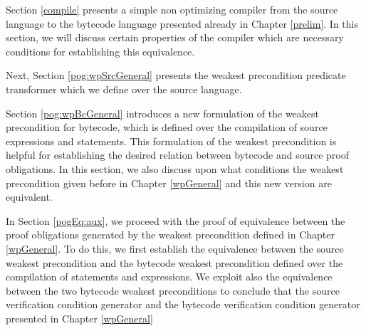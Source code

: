 Section \ref{compile} presents a simple non optimizing compiler from the source language to the bytecode
 language presented already in Chapter \ref{prelim}. In this section, we will discuss certain properties of the 
compiler which are necessary conditions for establishing this equivalence.

Next, Section \ref{pog:wpSrcGeneral} presents the weakest precondition predicate 
transformer which we define over the source language.

Section  \ref{pog:wpBcGeneral} introduces a new formulation of the weakest precondition for bytecode, which 
is defined over the  compilation of source expressions and statements. This formulation of the weakest precondition
 is helpful for establishing the desired 
relation between bytecode and source proof obligations.
 In this section, we also discuss upon what conditions
the weakest precondition given before in Chapter \ref{wpGeneral} and 
this new version are equivalent.

In Section \ref{pogEq:aux}, we proceed with the proof of equivalence between the proof obligations generated 
by the weakest precondition defined in  Chapter \ref{wpGeneral}.
To do this, we first establish  the equivalence between the source weakest precondition and the bytecode weakest precondition
 defined over the compilation of statements and expressions. We exploit also the equivalence  between the two  bytecode weakest preconditions
to conclude that the source verification condition generator and the bytecode verification condition generator presented in Chapter \ref{wpGeneral}
 








